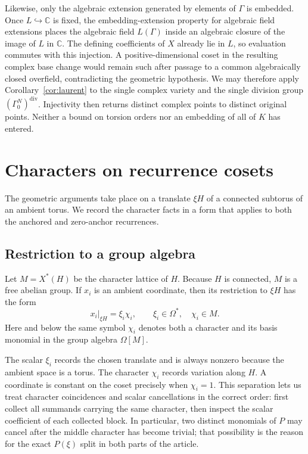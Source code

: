 \documentclass[11pt]{article}
\theoremstyle{definition}
\theoremstyle{remark}
\newcommand{\Om}{\Omega}
\newcommand{\C}{\mathbb{C}}
\newcommand{\Gam}{\Gamma}
\newcommand{\divh}{\mathrm{div}}
\begin{document}
Likewise, only the algebraic extension generated by elements of $\Gam$ is
embedded.  Once $L\hookrightarrow\C$ is fixed, the embedding-extension
property for algebraic field extensions places the algebraic field
$L(\Gam)$ inside an algebraic closure of the image of $L$ in $\C$.  The
defining coefficients of $X$ already lie in $L$, so evaluation commutes with
this injection.  A positive-dimensional coset in the resulting complex
base change would remain such after passage to a common algebraically closed
overfield, contradicting the geometric hypothesis.  We may therefore apply
Corollary~\ref{cor:laurent} to the single complex variety and the single
division group $(\Gam_0^N)^{\divh}$.  Injectivity then returns distinct
complex points to distinct original points.  Neither a bound on torsion
orders nor an embedding of all of $K$ has entered.

\section{Characters on recurrence cosets}
\label{sec:characters}

The geometric arguments take place on a translate $\xi H$ of a connected subtorus of an ambient torus.  We record the character facts in a form that applies to both the anchored and zero-anchor recurrences.

\subsection{Restriction to a group algebra}

Let $M=X^*(H)$ be the character lattice of $H$.  Because $H$ is connected, $M$ is a free abelian group.  If $x_i$ is an ambient coordinate, then its restriction to $\xi H$ has the form
\begin{equation}
x_i|_{\xi H}=\xi_i\chi_i,
\qquad \xi_i\in\Om^*,\quad \chi_i\in M.
\label{eq:coordinate-restriction}
\end{equation}
Here and below the same symbol $\chi_i$ denotes both a character and its basis monomial in the group algebra $\Om[M]$.

The scalar $\xi_i$ records the chosen translate and is always nonzero because
the ambient space is a torus.  The character $\chi_i$ records variation along
$H$.  A coordinate is constant on the coset precisely when $\chi_i=1$.
This separation lets us treat character coincidences and scalar
cancellations in the correct order: first collect all summands carrying the
same character, then inspect the scalar coefficient of each collected block.
In particular, two distinct monomials of $P$ may cancel after the middle
character has become trivial; that possibility is the reason for the exact
$P(\xi)$ split in both parts of the article.
\end{document}
